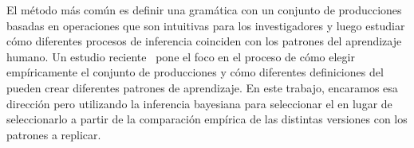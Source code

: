 
El método más común es definir una gramática con un conjunto de producciones basadas en operaciones que son intuitivas para los investigadores y luego estudiar cómo diferentes procesos de inferencia coinciden con los patrones del aprendizaje humano. Un estudio reciente~\cite{piantadosi2016logical} pone el foco en el proceso de cómo elegir empíricamente el conjunto de producciones y cómo diferentes definiciones del \lot pueden crear diferentes patrones de aprendizaje. En este trabajo, encaramos esa dirección pero utilizando la inferencia bayesiana para seleccionar el \lot en lugar de seleccionarlo a partir de la comparación empírica de las distintas versiones con los patrones a replicar.



